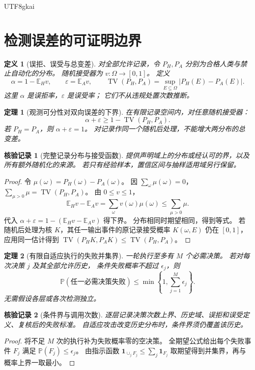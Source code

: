 \documentclass[12pt,a4paper,openany]{report}
\newtheorem{definition}{定义}[chapter]
\newtheorem{theorem}{定理}[chapter]
\newtheorem{Certificate}{核验记录}[chapter]
\newcommand{\EE}{\mathbb E}
\newcommand{\PP}{\mathbb P}
\newcommand{\TV}{\operatorname{TV}}
\newcommand{\Ind}{\mathbf 1}
\begin{document}
\begin{CJK*}{UTF8}{gkai}
\section{检测误差的可证明边界}
\begin{definition}[误拒、误受与总变差]
对全部允许记录，令 \(P_H,P_A\) 分别为合格人类与禁止自动化的分布。
随机接受器为 \(v:\Omega\to[0,1]\)。
定义
\[
\alpha=1-\EE_Hv,\qquad \varepsilon=\EE_Av,\qquad
\TV(P_H,P_A)=\sup_{E\subseteq\Omega}|P_H(E)-P_A(E)|.
\]
这里 \(\alpha\) 是误拒率，\(\varepsilon\) 是误受率；
它们不从违规处置次数推断。
\end{definition}

\begin{theorem}[观测可分性对双向误差的下界]
\label{thm:tv}
在有限记录空间内，对任意随机接受器：
\[
\boxed{\alpha+\varepsilon\ge1-\TV(P_H,P_A).}
\]
若 \(P_H=P_A\)，则 \(\alpha+\varepsilon=1\)。
对记录作同一个随机后处理，不能增大两分布的总变差。
\end{theorem}
\begin{Certificate}[完整记录分布与接受函数]
提供声明域上的分布或经认可的界，以及所有额外随机化的来源。
若只有经验样本，置信区间与抽样适用域另行保留。
\end{Certificate}
\begin{proof}
令 \(\mu(\omega)=P_H(\omega)-P_A(\omega)\)。
因 \(\sum_\omega\mu(\omega)=0\)，
\(\sum_{\mu>0}\mu=\TV(P_H,P_A)\)。
由 \(0\le v\le1\)，
\[
\EE_Hv-\EE_Av=\sum_\omega v(\omega)\mu(\omega)
\le\sum_{\mu>0}\mu.
\]
代入 \(\alpha+\varepsilon=1-(\EE_Hv-\EE_Av)\) 得下界。
分布相同时期望相同，得到等式。
若随机后处理为核 \(K\)，其任一输出事件的原记录接受概率
\(K(\omega,E)\) 仍在 \([0,1]\)，应用同一估计得到
\(\TV(P_HK,P_AK)\le\TV(P_H,P_A)\)。
\end{proof}

\begin{theorem}[有限自适应执行的失败并集界]
\label{thm:union}
一轮执行至多有 \(M\) 个必需决策。
若对每次决策 \(j\) 及其全部允许历史，
条件失败概率不超过 \(\epsilon_j\)，则
\[
\PP(\text{任一必需决策失败})\le
\min\left\{1,\sum_{j=1}^{M}\epsilon_j\right\}.
\]
无需假设各层或各次检测独立。
\end{theorem}
\begin{Certificate}[条件界与调用次数]
逐层记录决策次数上界、历史域、误拒和误受定义、复核后的失败标准。
自适应攻击改变历史分布时，条件界须仍覆盖该历史。
\end{Certificate}
\begin{proof}
将不足 \(M\) 次的执行补为失败概率零的空决策。
全期望公式给出每个失败事件 \(F_j\) 满足
\(\PP(F_j)\le\epsilon_j\)。
由指示函数
\(\Ind_{\cup_jF_j}\le\sum_j\Ind_{F_j}\)
取期望得到并集界，再与概率上界一取最小。
\end{proof}


\end{CJK*}
\end{document}
